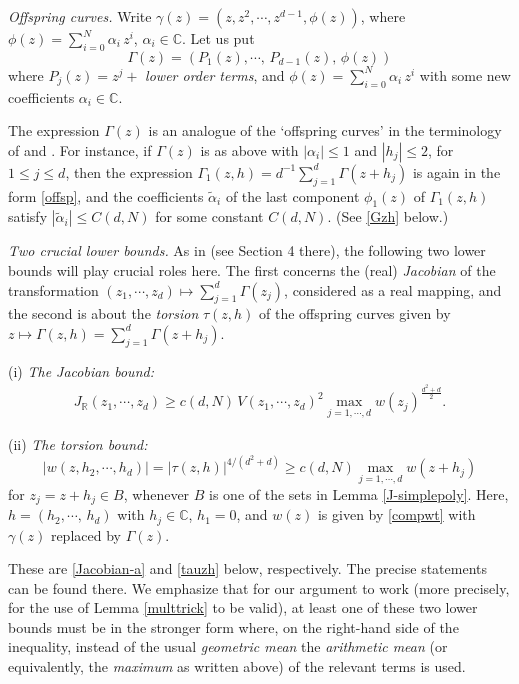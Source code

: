\documentclass[11 pt]{amsart}
\theoremstyle{plain}
\numberwithin{equation}{section}
\theoremstyle{plain}
\numberwithin{equation}{section}
\theoremstyle{remark}
\begin{document}
\medskip

{\sl Offspring curves.}
Write $\gamma(z)= (z, z^2, \cdots, z^{d-1}, \phi(z))$, where $\phi(z) = \sum_{i=0}^N \alpha_i \, z^i$, $\alpha_i \in {{\mathbb {C}}}$.
Let us put
\begin{equation}\label{offsp}
\Gamma(z) = (P_1(z), \cdots, \, P_{d-1}(z), \, \phi (z))
\end{equation}
where $P_j(z)= z^j+$ {\it lower order terms}, and $\phi (z) = \sum_{i=0}^N \alpha_i \,z^i$ with some new coefficients $\alpha_i \in {{\mathbb {C}}}$.

The expression $\Gamma (z)$ is an analogue of the `offspring curves' in the terminology of \cite{D1} and \cite{DM1}. For instance, if $\Gamma(z)$ is as above with $|\alpha_i| \le 1$ and $|h_j| \le 2$, for $1\le j\le d$, then the expression $\Gamma_1 (z,h) = d^{-1} \sum_{j=1}^d \Gamma(z+h_j)$ is again in the form \eqref{offsp}, and the coefficients $\widetilde{\alpha}_i$ of the last component $\phi_1(z)$ of $\Gamma_1 (z,h)$ satisfy $|\widetilde{\alpha}_i| \le C(d,N)$ for some constant $C(d,N)$.
(See \eqref{Gzh} below.)

\medskip

{\sl Two crucial lower bounds.}
As in \cite{BOS3} (see Section 4 there), the following two lower bounds will play crucial roles here. The first concerns the (real) {\it Jacobian} of the transformation $(z_1, \cdots, z_d) \mapsto \sum_{j=1}^d \Gamma(z_j)$, considered as a real mapping, and the second is about the {\it torsion} $\tau(z,h)$ of the offspring curves given by $z\mapsto \Gamma(z,h) = \sum_{j=1}^d \Gamma(z+ h_j)$.

\medskip

\noindent
(i) {\sl The Jacobian bound:}
\begin{align}\label{Jacbound}
J_{{\mathbb {R}}} (z_1, \cdots , z_d) \ge c(d,N) \, V(z_1, \cdots , z_d)^2 \max_{j=1,\cdots ,d} w(z_j)^\frac{d^2+d}{2} .
\end{align}

\noindent
(ii) {\sl The torsion bound:}
\begin{equation}\label{torbound}
 |w(z, h_2,\cdots, h_d)| = |\tau(z,h)|^{4/(d^2+d)} \ge c(d,N) \max_{j=1,\cdots,d} w (z+ h_j)
\end{equation}
for $z_j = z+h_j \in B$, whenever $B$ is one of the sets in Lemma \ref{J-simplepoly}.
Here, $h=(h_2, \cdots, \, h_d)$ with $h_j \in {{\mathbb {C}}}$, $h_1=0$, and $w(z)$ is given by \eqref{compwt} with $\gamma(z)$ replaced by $\Gamma(z)$.

These are \eqref{Jacobian-a}
and \eqref{tauzh} below, respectively. The precise statements can be found there.
We emphasize that for our argument to work (more precisely, for the use of Lemma \ref{multtrick} to be valid), at least one of these two lower bounds must be in the stronger form where, on the right-hand side of the inequality, instead of the usual {\it geometric mean} the {\it arithmetic mean} (or equivalently, the {\it maximum} as written above) of the relevant terms is used.
\end{document}
